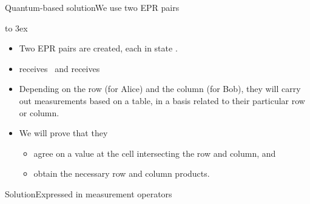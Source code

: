 {\begin{frame}{Quantum-based solution}{We use two EPR pairs}
\Vskip{-4em}\begin{center}
%
\hbox to 3ex{\hss}%
\end{center}%

\begin{itemize}[<+->]
    \item Two EPR pairs are created, each in state .
    \item {} receives~ and  receives~
    \item Depending on the row (for Alice) and the column (for Bob), they will carry out measurements based on a table, in a basis related to their particular row or column.
    \item We will prove that they
    \begin{itemize}
        \item agree on a value at the cell intersecting the row and column, and
        \item obtain the necessary row and column products.
    \end{itemize}
\end{itemize}
    
\end{frame}

\def\MPSoln{%
{\small%
\MPSquare{\TP{\PauliZ}{\Identity}}{\TP{\Identity}{\PauliZ}}{\TP{\PauliZ}{\PauliZ}}{\TP{\Identity}{\PauliX}}{\TP{\PauliX}{\Identity}}{\TP{\PauliX}{\PauliX}}{$-$\TP{\PauliZ}{\PauliX}}{$-$\TP{\PauliX}{\PauliZ}}{\TP{\PauliY}{\PauliY}}}}
\def\TP#1#2{{\scriptsize\ensuremath{#1\!\otimes\! #2}}}

\begin{frame}{Solution}{Expressed in measurement operators}

\begin{center}
    \MPSoln{}
\end{center}
    
\end{frame}

}
